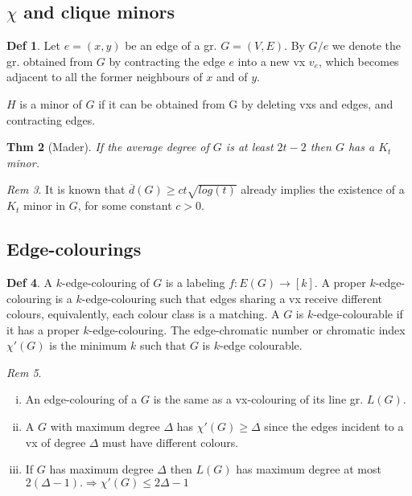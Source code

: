 \documentclass[11pt, fleqn, a4paper, landscape]{article}
\theoremstyle{plain} %
\newtheorem{thm}{Thm}
\theoremstyle{remark} %
\newtheorem{rem}[thm]{Rem}
\theoremstyle{definition} %
\newtheorem{defi}[thm]{Def}
\begin{document}
\begin{multicols}{5}
\subsection{$\chi$ and clique minors}
\begin{defi}
Let $e = (x, y)$ be an edge of a gr. $G = (V,E)$. By $G\slash e$ we denote the gr. obtained from $G$ by contracting the edge $e$ into a new vx $v_e$, which becomes adjacent to all the former neighbours of $x$ and of $y$. 

$H$ is a minor of $G$ if it can be obtained from G by deleting vxs and edges, and contracting edges.
\end{defi}
\addtocounter{thm}{2}
\begin{thm}[Mader]
If the average degree of $G$ is at least $2t-2$ then $G$ has a $K_t$ minor.
\end{thm}

\begin{rem}
It is known that $\overline{d}(G) \ge ct\sqrt{log(t)}$ already implies the existence of a $K_t$ minor in $G$, for some constant $c > 0$.
\end{rem}
\subsection{Edge-colourings}
\begin{defi}
A $k$-edge-colouring of $G$ is a labeling $f : E(G) \to [k]$. A proper $k$-edge-colouring is a $k$-edge-colouring such that edges sharing a vx receive different colours, equivalently, each colour class is a matching. A $G$ is $k$-edge-colourable if it has a
proper $k$-edge-colouring. The edge-chromatic number or chromatic index $\chi'(G)$ is the minimum $k$ such that $G$ is $k$-edge colourable.
\end{defi}

\begin{rem}
\begin{enumerate}[(i)]
\item An edge-colouring of a $G$ is the same as a vx-colouring of its line gr. $L(G)$.
\item A $G$ with maximum degree $\Delta$ has $\chi'(G) \ge \Delta$ since the edges incident to a vx of degree $\Delta$ must have different colours.
\item If $G$ has maximum degree $\Delta$ then $L(G)$ has maximum degree at most $2(\Delta-1).\Rightarrow \chi'(G) \le 2\Delta - 1$ 
\end{enumerate}
\end{rem}


\end{multicols}
\end{document}
